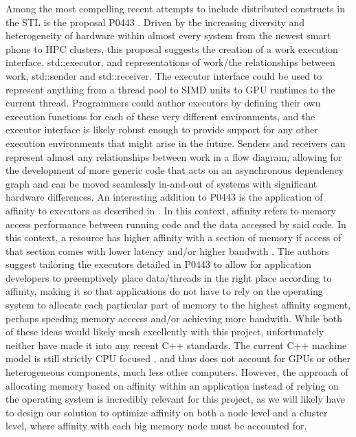 Among the most compelling recent attempts to include distributed constructs in the STL is the proposal P0443 \cite{p0443}. Driven by the increasing diversity and heterogeneity of hardware within almost every system from the newest smart phone to HPC clusters, this proposal suggests the creation of a work execution interface, std::executor, and representations of work/the relationships between work, std::sender and std::receiver. The executor interface could be used to represent anything from a thread pool to SIMD units to GPU runtimes to the current thread. Programmers could author executors by defining their own execution functions for each of these very different environments, and the executor interface is likely robust enough to provide support for any other execution environments that might arise in the future. Senders and receivers can represent almost any relationships between work in a flow diagram, allowing for the development of more generic code that acts on an asynchronous dependency graph and can be moved seamlessly in-and-out of systems with significant hardware differences. An interesting addition to P0443 is the application of affinity to executors as described in \cite{towards_dist_cpp}. In this context, affinity refers to memory access performance between running code and the data accessed by said code. In this context, a resource has higher affinity with a section of memory if access of that section comes with lower latency and/or higher bandwith \cite{towards_dist_cpp}. The authors suggest tailoring the executors detailed in P0443 to allow for application developers to preemptively place data/threads in the right place according to affinity, making it so that applications do not have to rely on the operating system to allocate each particular part of memory to the highest affinity segment, perhaps speeding memory accecss and/or achieving more bandwith. While both of these ideas would likely mesh excellently with this project, unfortunately neither have made it into any recent C++ standards. The current C++ machine model is still strictly CPU focused \cite{towards_dist_cpp}, and thus does not account for GPUs or other heterogeneous components, much less other computers. However, the approach of allocating memory based on affinity within an application instead of relying on the operating system is incredibly relevant for this project, as we will likely have to design our solution to optimize affinity on both a node level and a cluster level, where affinity with each big memory node must be accounted for.  

